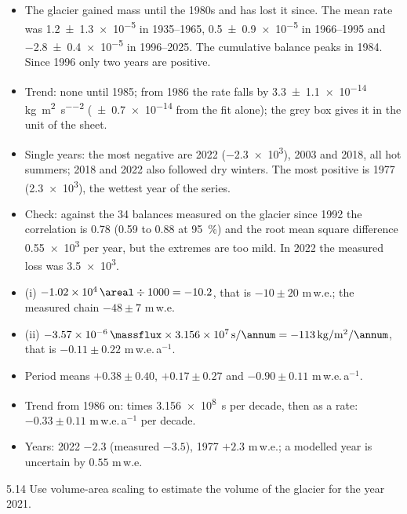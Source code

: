 \documentclass{scrartcl}
\begin{document}
\begin{reportpart}
{\begin{itemize}
  \item The glacier gained mass until the 1980s and has lost it since. The mean rate was
    \qty{+1.2 \pm 1.3 e-5}{\massflux} in 1935--1965, \qty{+0.5 \pm 0.9 e-5}{} in 1966--1995 and
    \qty{-2.8 \pm 0.4 e-5}{} in 1996--2025. The cumulative balance peaks in 1984. Since 1996
    only two years are positive.
  \item Trend: none until 1985; from 1986 the rate falls by \num{3.3 \pm 1.1 e-14}
    \unit{\kilo\gram\per\square\metre\per\square\second} (\num{\pm 0.7e-14} from the fit
    alone); the grey box gives it in the unit of the sheet.
  \item Single years: the most negative are 2022 (\qty{-2.3e3}{\areal}), 2003 and 2018, all
    hot summers; 2018 and 2022 also followed dry winters. The most positive is 1977
    (\qty{+2.3e3}{\areal}), the wettest year of the series.
  \item Check: against the 34 balances measured on the glacier since 1992 the correlation is
    0.78 (0.59 to 0.88 at \qty{95}{\percent}) and the root mean square difference
    \qty{0.55e3}{\areal} per year, but the extremes are too mild. In 2022 the measured loss was
    \qty{3.5e3}{\areal}.
\end{itemize}

\begin{converted}
\begin{itemize}
  \item (i) $\qty{-1.02e4}{\areal} \div 1000 = -10.2$, that is $-10 \pm 20$ m\,w.e.; the
    measured chain $-48 \pm 7$ m\,w.e.
  \item (ii) $\qty{-3.57e-6}{\massflux} \times \qty{3.156e7}{\second\per\annum}
    = \qty{-113}{\kilo\gram\per\square\metre\per\annum}$,\\ that is $-0.11 \pm 0.22$ m\,w.e.\,a$^{-1}$.
  \item Period means $+0.38 \pm 0.40$, $+0.17 \pm 0.27$ and $-0.90 \pm 0.11$ m\,w.e.\,a$^{-1}$.
  \item Trend from 1986 on: times \qty{3.156e8}{\second} per decade, then as a rate:
    $-0.33 \pm 0.11$ m\,w.e.\,a$^{-1}$ per decade.
  \item Years: 2022 $-2.3$ (measured $-3.5$), 1977 $+2.3$ m\,w.e.; a modelled year is
    uncertain by $0.55$ m\,w.e.
\end{itemize}
\end{converted}}


\begin{question}{5.1}{4}\label{q:51}
Use volume-area scaling to estimate the volume of the glacier for the year 2021.


\end{question}
\end{reportpart}
\end{document}
